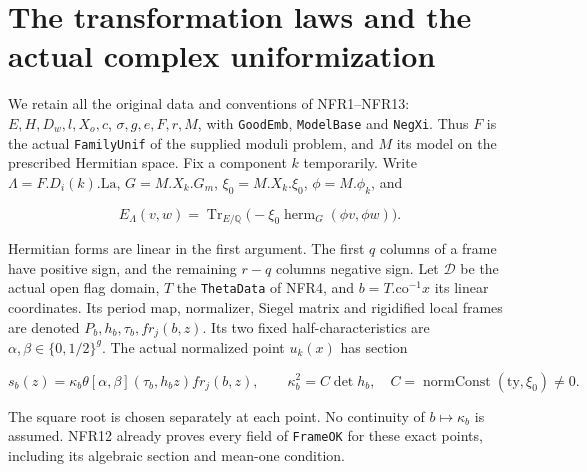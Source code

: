 \section{The transformation laws and the actual complex uniformization}
\label{sec:normalized-frame-laws-v051}


We retain all the original data and conventions of NFR1--NFR13:
$E,H,D_w,l,X_o,c$, $\sigma,g,e,F,r,M$, with \texttt{GoodEmb},
\texttt{ModelBase} and \texttt{NegXi}.  Thus $F$ is the actual
\texttt{FamilyUnif} of the supplied moduli problem, and $M$ its model
on the prescribed Hermitian space.  Fix a component $k$ temporarily.
Write $\Lambda=F.D_i(k).\mathrm{La}$, $G=M.X_k.G_m$,
$\xi_0=M.X_k.\xi_0$, $\phi=M.\phi_k$, and

\[
 E_\Lambda(v,w)=\operatorname{Tr}_{E/\mathbb Q}
       \bigl(-\xi_0\operatorname{herm}_G(\phi v,\phi w)\bigr).
 \tag{NFL.1}
\]

Hermitian forms are linear in the first argument.  The first $q$
columns of a frame have positive sign, and the remaining $r-q$
columns negative sign.  Let $\mathcal D$ be the actual open flag
domain, $T$ the \texttt{ThetaData} of NFR4, and
$b=T.\mathrm{co}^{-1}x$ its linear coordinates.  Its period map,
normalizer, Siegel matrix and rigidified local frames are denoted
$P_b,h_b,\tau_b,fr_j(b,z)$.  Its two fixed half-characteristics are
$\alpha,\beta\in\{0,1/2\}^g$.  The actual normalized point
$u_k(x)$ has section

\[
 s_b(z)=\kappa_b\theta[\alpha,\beta](\tau_b,h_bz)fr_j(b,z),
 \qquad \kappa_b^2=C\det h_b,
 \quad C=\operatorname{normConst}(\mathrm{ty},\xi_0)\ne0.
 \tag{NFL.2}
\]

The square root is chosen separately at each point.  No continuity
of $b\mapsto\kappa_b$ is assumed.  NFR12 already proves every field
of \texttt{FrameOK} for these exact points, including its algebraic
section and mean-one condition.

